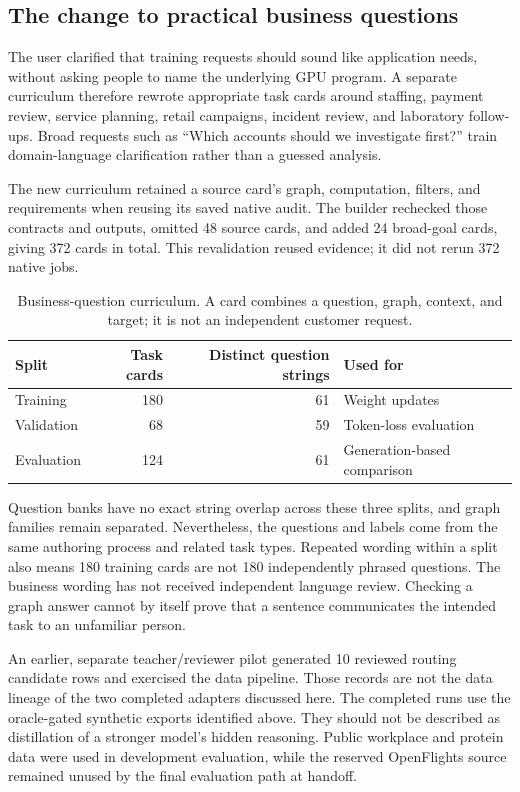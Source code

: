 \documentclass[11pt,a4paper]{article}
\begin{document}
\subsection{The change to practical business questions}

The user clarified that training requests should sound like application needs,
without asking people to name the underlying GPU program. A separate curriculum
therefore rewrote appropriate task cards around staffing, payment review,
service planning, retail campaigns, incident review, and laboratory follow-ups.
Broad requests such as ``Which accounts should we investigate first?'' train
domain-language clarification rather than a guessed analysis.

The new curriculum retained a source card's graph, computation, filters, and
requirements when reusing its saved native audit. The builder rechecked those
contracts and outputs, omitted 48 source cards, and added 24 broad-goal cards,
giving 372 cards in total. This revalidation reused evidence; it did not rerun
372 native jobs.~\cite{curriculum}

\begin{table}[htbp]
\centering
\begin{tabular}{@{}lrrl@{}}
\toprule
Split & Task cards & Distinct question strings & Used for \\
\midrule
Training & 180 & 61 & Weight updates \\
Validation & 68 & 59 & Token-loss evaluation \\
Evaluation & 124 & 61 & Generation-based comparison \\
\bottomrule
\end{tabular}
\caption{Business-question curriculum. A card combines a question, graph,
context, and target; it is not an independent customer request.}
\label{tab:data}
\end{table}

Question banks have no exact string overlap across these three splits, and graph
families remain separated. Nevertheless, the questions and labels come from the
same authoring process and related task types. Repeated wording within a split
also means 180 training cards are not 180 independently phrased questions.
The business wording has not received independent language review. Checking a
graph answer cannot by itself prove that a sentence communicates the intended
task to an unfamiliar person.

An earlier, separate teacher/reviewer pilot generated 10 reviewed routing
candidate rows and exercised the data pipeline. Those records are not the data
lineage of the two completed adapters discussed here. The completed runs use the
oracle-gated synthetic exports identified above. They should not be described as
distillation of a stronger model's hidden reasoning. Public workplace and protein
data were used in development evaluation, while the reserved OpenFlights source
remained unused by the final evaluation path at handoff.~\cite{progress}
\end{document}
